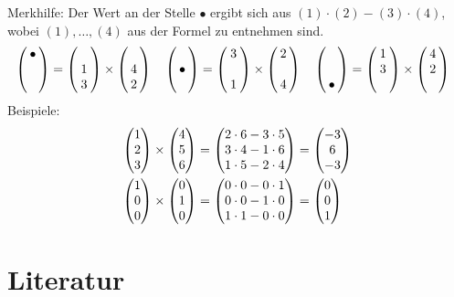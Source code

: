 		\noindent Merkhilfe: Der Wert an der Stelle $\bullet$ ergibt sich aus
		$(1)\cdot(2)-(3)\cdot(4)$, wobei $(1),\dots, (4)$ aus der Formel zu entnehmen
		sind.
		\[\hspace{-7pt}\mvect{\bullet\\\phantom{c_2} \\ \phantom{c_3}} =
		\mvect{\phantom{a_1}\\1\\3}\times
		\mvect{\phantom{b_1}\\4\\2} \quad \mvect{\phantom{c_2} \\ \bullet\\
		\phantom{c_3}} =
		\mvect{3\\\phantom{a_1}\\1}\times
		\mvect{2\\\phantom{b_1}\\4}
		 \quad \mvect{\phantom{c_2} \\ \phantom{c_3}\\ \bullet} =
		\mvect{1\\3\\\phantom{a_1}}\times
		\mvect{4\\2\\\phantom{b_1}}\]
		\newline
		Beispiele:
		\begin{align*}
			\mvect{1\\2\\3}\times \mvect{4\\5\\6} &= \mvect{2\cdot 6-3\cdot 5\\ 3\cdot 4
			- 1\cdot 6\\ 1\cdot 5 - 2\cdot 4} = \mvect{-3\\ 6 \\ -3} \\
			\mvect{1\\0\\0} \times \mvect{0\\ 1 \\ 0} &= \mvect{0\cdot0 - 0\cdot1\\
			0\cdot0 - 1\cdot 0\\ 1\cdot1 - 0\cdot0} = \mvect{0\\0\\1}
		\end{align*}
	
	\section{Literatur}
		
